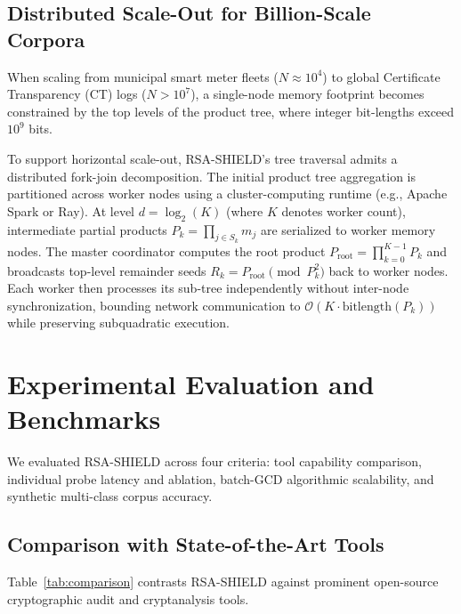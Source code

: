 \documentclass[sigconf,nonacm]{acmart}
\begin{document}
\subsection{Distributed Scale-Out for Billion-Scale Corpora}
When scaling from municipal smart meter fleets ($N \approx 10^4$) to global Certificate Transparency (CT) logs ($N > 10^7$), a single-node memory footprint becomes constrained by the top levels of the product tree, where integer bit-lengths exceed $10^9$ bits. 

To support horizontal scale-out, RSA-SHIELD's tree traversal admits a distributed fork-join decomposition. The initial product tree aggregation is partitioned across worker nodes using a cluster-computing runtime (e.g., Apache Spark or Ray). At level $d = \log_2(K)$ (where $K$ denotes worker count), intermediate partial products $P_k = \prod_{j \in S_k} m_j$ are serialized to worker memory nodes. The master coordinator computes the root product $P_{\text{root}} = \prod_{k=0}^{K-1} P_k$ and broadcasts top-level remainder seeds $R_k = P_{\text{root}} \pmod{P_k^2}$ back to worker nodes. Each worker then processes its sub-tree independently without inter-node synchronization, bounding network communication to $\mathcal{O}(K \cdot \text{bitlength}(P_k))$ while preserving subquadratic execution.

\section{Experimental Evaluation and Benchmarks}
We evaluated RSA-SHIELD across four criteria: tool capability comparison, individual probe latency and ablation, batch-GCD algorithmic scalability, and synthetic multi-class corpus accuracy.

\subsection{Comparison with State-of-the-Art Tools}
Table~\ref{tab:comparison} contrasts RSA-SHIELD against prominent open-source cryptographic audit and cryptanalysis tools.
\end{document}

